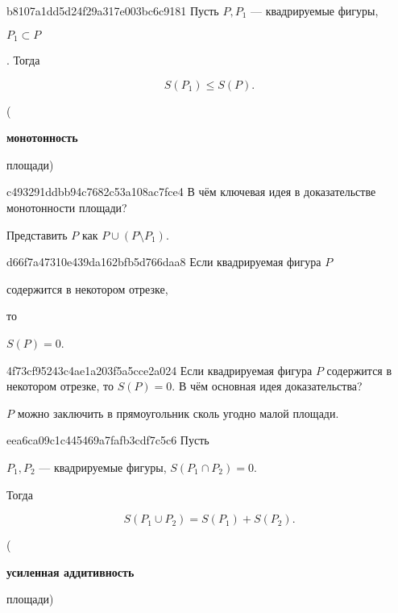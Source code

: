\begin{note}{b8107a1dd5d24f29a317e003bc6c9181}
    Пусть \({ P, P_1 }\) --- квадрируемые фигуры, \begin{icloze}{2}\({ P_1 \subset P }\)\end{icloze}.
    Тогда
    \begin{icloze}{1}
        \[
            S(P_1) \leqslant S(P).
        \]
    \end{icloze}

    \begin{center}
        \tiny
        (\begin{icloze}{3}\textbf{монотонность}\end{icloze} площади)
    \end{center}
\end{note}

\begin{note}{c493291ddbb94c7682c53a108ac7fce4}
    В чём ключевая идея в доказательстве монотонности площади?

    \begin{cloze}{1}
        Представить \({ P }\) как \({ P \cup (P \setminus P_1) }\).
   \end{cloze}
\end{note}

\begin{note}{d66f7a47310e439da162bfb5d766daa8}
    Если квадрируемая фигура \({ P }\) \begin{icloze}{2}содержится в некотором отрезке,\end{icloze} то \begin{icloze}{1}\({ S(P) = 0 }\).\end{icloze}
\end{note}

\begin{note}{4f73cf95243c4ae1a203f5a5cce2a024}
    Если квадрируемая фигура \({ P }\) содержится в некотором отрезке, то \({ S(P) = 0 }\).
    В чём основная идея доказательства?

    \begin{cloze}{1}
        \({ P }\) можно заключить в прямоугольник сколь угодно малой площади.
    \end{cloze}
\end{note}

\begin{note}{eea6ca09c1c445469a7fafb3cdf7c5c6}
    Пусть \begin{icloze}{1}\({ P_1, P_2 }\) --- квадрируемые фигуры, \({ S(P_1 \cap P_2) = 0 }\).\end{icloze}
    Тогда
    \begin{icloze}{2}
        \[
            S(P_1 \cup P_2) = S(P_1) + S(P_2).
        \]
    \end{icloze}

    \begin{center}
        \tiny
        (\begin{icloze}{3}\textbf{усиленная аддитивность}\end{icloze} площади)
    \end{center}
\end{note}

